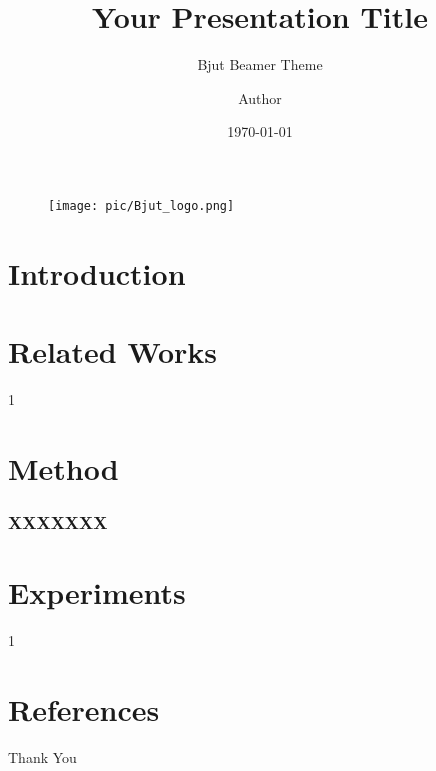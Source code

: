 \documentclass{beamer}
\author{Author}
\title{Your Presentation Title}
\subtitle{Bjut Beamer Theme}
\institute{
    Beijing University of Technology
}
\date{\today}
\begin{document}
\begin{frame}
    \titlepage
    \begin{figure}[htpb]
        \begin{center}
            \texttt{[image: pic/Bjut\_logo.png]}
        \end{center}
    \end{figure}
\end{frame}

\begin{frame}
    \tableofcontents[sectionstyle=show,subsectionstyle=show/shaded/hide,subsubsectionstyle=show/shaded/hide]
\end{frame}

\section{Introduction}
\begin{frame}
\end{frame}

\section{Related Works}

\begin{frame}
	1
\end{frame}



\section{Method}

\begin{frame}
	\frametitle{XXXXXXX}
\end{frame}

\section{Experiments}

\begin{frame}
	1
\end{frame}


\section{References}
\begin{frame}[allowframebreaks]
	
	
	\nocite{*} %
\end{frame}


\begin{frame}
    \begin{center}
        {Thank You}
    \end{center}
\end{frame}
\end{document}
